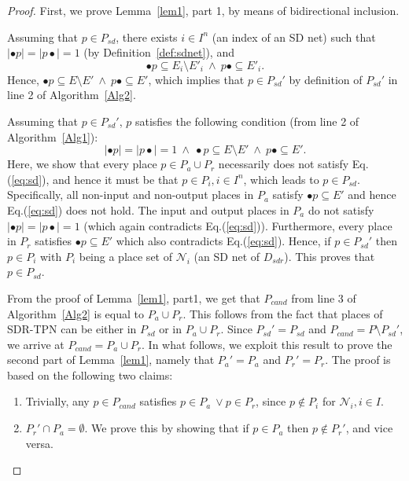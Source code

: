 \documentclass[11pt]{article}
\begin{document}
\begin{proof}
	
	First, we prove Lemma~\ref{lem1}, part 1, by means of bidirectional inclusion. 	
	
	\noindent Assuming that $p \in P_{sd}$, there exists
	$i \in I^n$ (an index of an SD net) such that 
	$|\bullet p| = |p \bullet| = 1$ (by Definition~\ref{def:sdnet}), 
	and $$\bullet p \subseteq E_i \setminus E'_i \ \land \ p\bullet \subseteq E'_i.$$
	Hence, $\bullet p \subseteq E \setminus E' \ \land \ p\bullet \subseteq E'$, which 
	implies that $p \in P_{sd}'$ by definition of $P_{sd}'$ in line 2 of Algorithm~\ref{Alg2}. 
	
	\noindent Assuming that $p \in P_{sd}'$, 
	$p$ satisfies the following condition (from line 2 of Algorithm~\ref{Alg1}): \begin{equation} 
	\label{eq:sd}|\bullet p| = |p \bullet| = 1 \ \land \ \bullet p \subseteq E \setminus E' \ \land \ p\bullet \subseteq E'.\end{equation} Here, we show that every place $p \in P_a \cup P_r$ necessarily does 
	not satisfy Eq.(\ref{eq:sd}), 
	and hence it must be that $p \in P_i, i \in I^n$, which leads to $p \in P_{sd}$. Specifically, all non-input and non-output 
	places in $P_a$ satisfy $\bullet p \subseteq E'$ and hence Eq.(\ref{eq:sd}) does not hold. The input and output places
	in $P_a$ do not satisfy $|\bullet p| = |p \bullet| = 1$ (which again contradicts Eq.(\ref{eq:sd})). 
	Furthermore, every place in $P_r$ satisfies $\bullet p \subseteq E'$ which also 
	contradicts Eq.(\ref{eq:sd}). Hence, if $p \in P_{sd}'$ then $p \in P_i$ with 
	$P_i$ being a place set of $\mathcal{N}_i$ (an SD net of $D_{sdr}$). This proves that
	$p \in P_{sd}$. 
	
	From the proof of Lemma~\ref{lem1}, part1, we get that $P_{cand}$ from line 3 of Algorithm~\ref{Alg2} is
	equal to $P_a \cup P_r$. This follows from the fact that places 
	of SDR-TPN can be either in $P_{sd}$ or in $P_a \cup P_r$. Since $P_{sd}' = P_{sd}$ and $P_{cand} = P \setminus P_{sd}'$,
	we arrive at $P_{cand} = P_a \cup P_r$. In what follows, we exploit this result to prove the second part of Lemma~\ref{lem1}, namely that $P_a' = P_a$ and $P_r' = P_r$. The proof is based on the following two claims: \begin{enumerate}
		\item Trivially, any $p \in P_{cand}$ satisfies $p \in P_a \ \lor p \in P_r$,
		since $p \notin P_i$ for $\mathcal{N}_i, i \in I$.
		\item $P_r' \cap P_a = \emptyset$. We prove
		this by showing that if $p \in P_a$ then $p \notin P_r'$, and vice versa. 
		

\end{enumerate}
\end{proof}
\end{document}
